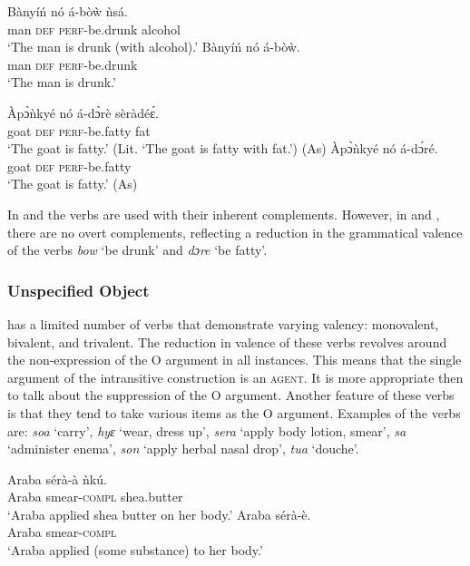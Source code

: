\documentclass[output=paper]{langsci/langscibook}
\begin{document}
\ea\label{ex:38.osam}
\ea\label{ex:38a.osam}
\gll   Bànyíń  nó  á-bòẁ    ǹsá.\\
       man  \textsc{def}  \textsc{perf}-be.drunk  alcohol\\
\glt `The man is drunk (with alcohol).'
\ex\label{ex:38b.osam}
\gll  Bànyíń  nó  á-bòẁ.\\
       man  \textsc{def}  \textsc{perf}-be.drunk\\
\glt `The man is drunk.'
\z 
\z 


\ea\label{ex:39.osam}
\ea\label{ex:39a.osam}
\gll   Àpɔ̀ǹkyé  nó  á-dɔ̀rè      sèràdé\'{ɛ}.\\
       goat    \textsc{def}  \textsc{perf}-be.fatty    fat\\
\glt   `The goat is fatty.' (Lit. `The goat is fatty with fat.') (As)
\ex\label{ex:39b.osam}
\gll   Àpɔ̀ǹkyé  nó  á-dɔ́ré.      \\
       goat    \textsc{def}  \textsc{perf}-be.fatty  \\
\glt   `The goat is fatty.' (As)
\z 
\z 


In  and  the verbs are used with their inherent complements. However, in  and , there are no overt complements, reflecting a reduction in the grammatical valence of the verbs \textit{bow} `be drunk' and \textit{dɔre} `be fatty'.

\subsubsection{Unspecified Object}\label{§4.5.2:unspecified.osam}

 has a limited number of verbs that demonstrate varying valency: monovalent, bivalent, and trivalent. The reduction in valence of these verbs revolves around the non-expression of the O argument in all instances. This means that the single argument of the intransitive construction is an \textsc{agent}. It is more appropriate then to talk about the suppression of the O argument. Another feature of these verbs is that they tend to take various items as the O argument. Examples of the verbs are: \textit{soa} `carry', \textit{hyɛ} `wear, dress up', \textit{sera} `apply body lotion, smear', \textit{sa} `administer enema', \textit{son} `apply herbal nasal drop', \textit{tua} `douche'.

\ea\label{ex:40.osam}
\ea\label{ex:40a.osam}
\gll   Araba  sérà-à    ǹkú.\\
       Araba  smear-\textsc{compl}  shea.butter\\
\glt `Araba applied shea butter on her body.'
\ex\label{ex:40b.osam}
\gll   Araba  sérà-è.\\
       Araba  smear-\textsc{compl}\\
\glt `Araba applied (some substance) to her body.'
\z 
\z 
\end{document}
